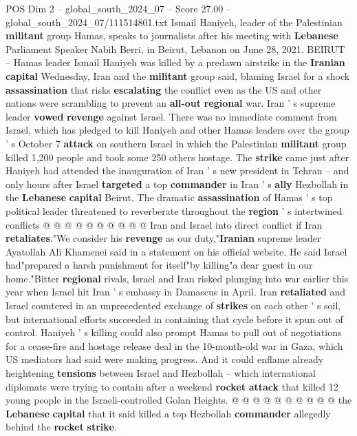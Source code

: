 \begin{textsample}{POS Dim 2 – global\_south\_2024\_07 – Score 27.00 – global\_south\_2024\_07/111514801.txt}  \label{ex:f2_pos_064}
Ismail Haniyeh, leader of the Palestinian \textbf{militant} group Hamas, speaks to journalists after his meeting with \textbf{Lebanese} Parliament Speaker Nabih Berri, in Beirut, Lebanon on June 28, 2021.
BEIRUT -- Hamas leader Ismail Haniyeh was killed by a predawn airstrike in the \textbf{Iranian} \textbf{capital} Wednesday, Iran and the \textbf{militant} group said, blaming Israel for a shock \textbf{assassination} that risks \textbf{escalating} the conflict even as the US and other nations were scrambling to prevent an \textbf{all-out} \textbf{regional} war.
Iran ' s supreme leader \textbf{vowed} \textbf{revenge} against Israel.
There was no immediate comment from Israel, which has pledged to kill Haniyeh and other Hamas leaders over the group ' s October 7 \textbf{attack} on southern Israel in which the Palestinian \textbf{militant} group killed 1,200 people and took some 250 others hostage.
The \textbf{strike} came just after Haniyeh had attended the inauguration of Iran ' s new president in Tehran -- and only hours after Israel \textbf{targeted} a top \textbf{commander} in Iran ' s \textbf{ally} Hezbollah in the \textbf{Lebanese} \textbf{capital} Beirut.
The dramatic \textbf{assassination} of Hamas ' s top political leader threatened to reverberate throughout the \textbf{region} ' s intertwined conflicts @ @ @ @ @ @ @ @ @ @ Iran and Israel into direct conflict if Iran \textbf{retaliates}."We consider his \textbf{revenge} as our duty,"\textbf{Iranian} supreme leader Ayatollah Ali Khamenei said in a statement on his official website.
He said Israel had"prepared a harsh punishment for itself"by killing"a dear guest in our home."Bitter \textbf{regional} rivals, Israel and Iran risked plunging into war earlier this year when Israel hit Iran ' s embassy in Damascus in April.
Iran \textbf{retaliated} and Israel countered in an unprecedented exchange of \textbf{strikes} on each other ' s soil, but international efforts succeeded in containing that cycle before it spun out of control.
Haniyeh ' s killing could also prompt Hamas to pull out of negotiations for a cease-fire and hostage release deal in the 10-month-old war in Gaza, which US mediators had said were making progress.
And it could enflame already heightening \textbf{tensions} between Israel and Hezbollah -- which international diplomats were trying to contain after a weekend \textbf{rocket} \textbf{attack} that killed 12 young people in the Israeli-controlled Golan Heights. @ @ @ @ @ @ @ @ @ @ the \textbf{Lebanese} \textbf{capital} that it said killed a top Hezbollah \textbf{commander} allegedly behind the \textbf{rocket} \textbf{strike}.

\end{textsample}
